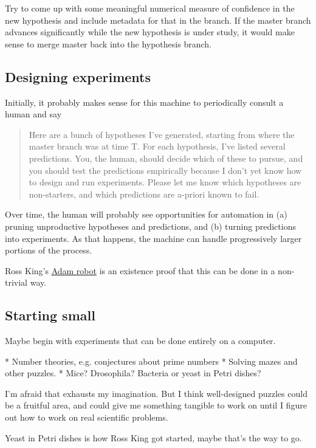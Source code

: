 \documentclass{article}
\begin{document}
Try to come up with some meaningful numerical measure of confidence in the new hypothesis
and include metadata for that in the branch. If the master branch advances significantly
while the new hypothesis is under study, it would make sense to merge master back into
the hypothesis branch.

\subsection{Designing experiments}

Initially, it probably makes sense for this machine to periodically consult a human and
say

\begin{quotation}
Here are a bunch of hypotheses I've generated, starting from where the master branch
was at time T. For each hypothesis, I've listed several predictions. You, the human,
should decide which of these to pursue, and you should test the predictions
empirically because I don't yet know how to design and run experiments. Please let me
know which hypotheses are non-starters, and which predictions are a-priori known to fail.
\end{quotation}

Over time, the human will probably see opportunities for automation in (a) pruning unproductive
hypotheses and predictions, and (b) turning predictions into experiments. As that happens,
the machine can handle progressively larger portions of the process.

Ross King's \href{https://en.wikipedia.org/wiki/Robot_Scientist}{Adam robot} is an existence
proof that this can be done in a non-trivial way.

\subsection{Starting small}

Maybe begin with experiments that can be done entirely on a computer.

* Number theories, e.g. conjectures about prime numbers
* Solving mazes and other puzzles.
* Mice? Drosophila? Bacteria or yeast in Petri dishes?

I'm afraid that exhausts my imagination. But I think well-designed puzzles could be a
fruitful area, and could give me something tangible to work on until I figure out how to
work on real scientific problems.

Yeast in Petri dishes is how Ross King got started, maybe that's the way to go.
\end{document}
